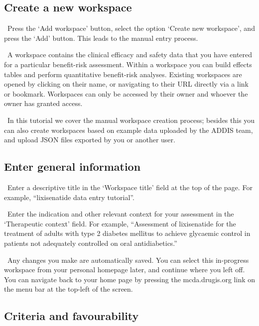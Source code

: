 \documentclass[00_mcda_tutorial.tex]{subfiles}
\begin{document}
\subsection*{Create a new workspace}
\leftpointright \, Press the ‘Add workspace’ button, select the option ‘Create new workspace’, and press the ‘Add’ button.
This leads to the manual entry process.
\newline

\noindent \faGraduationCap \, A workspace contains the clinical efficacy and safety data that you have entered for a particular benefit-risk assessment. Within a workspace you can build effects tables and perform quantitative benefit-risk analyses. Existing workspaces are opened by clicking on their name, or navigating to their URL directly via a link or bookmark. Workspaces can only be accessed by their owner and whoever the owner has granted access.
\newline

\noindent \faLightbulbO \, In this tutorial we cover the manual workspace creation process; besides this you can also create workspaces based on example data uploaded by the ADDIS team, and upload JSON files exported by you or another user.

\subsection*{Enter general information}
\noindent \leftpointright \, Enter a descriptive title in the ‘Workspace title’ field at the top of the page. For example, “lixisenatide data entry tutorial”.
\newline

\noindent \leftpointright \, Enter the indication and other relevant context for your assessment in the ‘Therapeutic context’ field. For example, “Assessment of lixisenatide for the treatment of adults with type 2 diabetes mellitus to achieve glycaemic control in patients not adequately controlled on oral antidiabetics.”
\newline

\noindent \faLightbulbO \, Any changes you make are automatically saved. You can select this in-progress workspace from your personal homepage later, and continue where you left off. You can navigate back to your home page by pressing the mcda.drugis.org link on the menu bar at the top-left of the screen.

\subsection*{Criteria and favourability}
\end{document}
